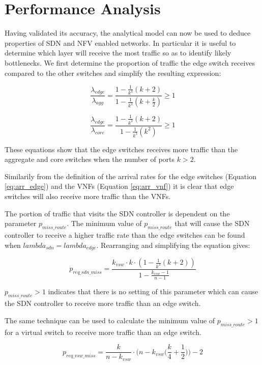 \section{Performance Analysis}
\label{sec:performance}
Having validated its accuracy, the analytical model can now be used to deduce properties of SDN and NFV enabled networks. In particular it is useful to determine which layer will receive the most traffic so as to identify likely bottlenecks. We first determine the proportion of traffic the edge switch receives compared to the other switches and simplify the resulting expression:

\begin{equation}
\frac{\lambda_{edge}}{\lambda_{agg}} = \frac{1 - \frac{1}{k^3}(k + 2)}{1 - \frac{1}{k^3}(k + \frac{k}{2})} \geq 1
\end{equation}

\begin{equation}
\frac{\lambda_{edge}}{\lambda_{core}} = \frac{1 - \frac{1}{k^3}(k + 2)}{1 - \frac{1}{k^3}(k^2)} \geq 1
\end{equation}

These equations show that the edge switches receives more traffic than the aggregate and core switches when the number of ports $k > 2$.

Similarily from the definition of the arrival rates for the edge switches (Equation \ref{eq:arr_edge}) and the VNFs (Equation \ref{eq:arr_vnf}) it is clear that edge switches will also receive more traffic than the VNFs.

The portion of traffic that visits the SDN controller is dependent on the parameter $p_{miss\_route}$. The minimum value of $p_{miss\_route}$ that will cause the SDN controller to receive a higher traffic rate than the edge switches can be found when $lambda_{sdn} = lambda_{edge}$. Rearranging and simplifying the equation gives:

\begin{equation}
p_{req\_sdn\_miss} = \frac{k_{vsw} \cdot k \cdot (1 - \frac{1}{k^3}(k + 2))}{1 - \frac{k_{vsw} - 1}{n - 1}}
\end{equation}

$p_{miss\_route} > 1$ indicates that there is no setting of this parameter which can cause the SDN controller to receive more traffic than an edge switch.

The same technique can be used to calculate the minimum value of $p_{miss\_route} > 1$ for a virtual switch to receive more traffic than an edge switch. 

\begin{equation}
p_{req\_vsw\_miss} = \frac{k}{n-k_{vsw}}\cdot\bigg(n-k_{vsw}\bigg(\frac{k}{4} + \frac{1}{2}\bigg)\bigg) - 2
\end{equation}